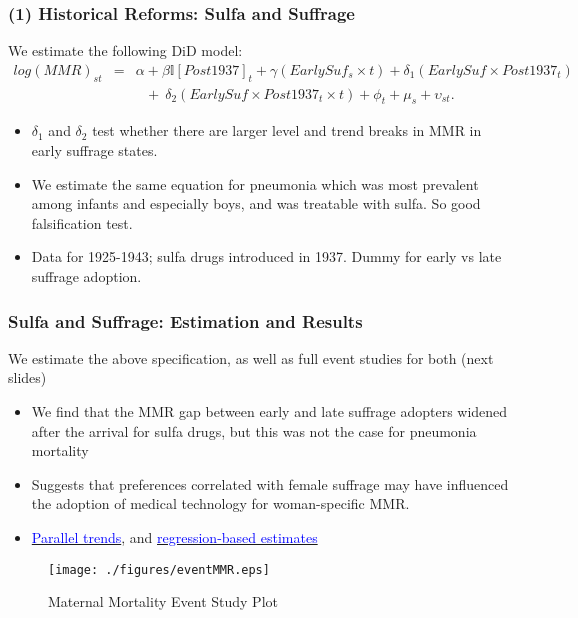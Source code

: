 \documentclass[10pt,letterpaper,subeqn]{beamer}
\begin{document}
\begin{frame}
\frametitle{(1) Historical Reforms: Sulfa and Suffrage}

We estimate the following DiD model:
\scriptsize
\begin{eqnarray}
log(MMR)_{st} & = &\alpha + \beta \mathbb{I}[Post1937]_t + \gamma(EarlySuf_{s}\times t)
                + \delta_1 (EarlySuf\times Post1937_t) \nonumber \\
              & &\ \ \ + \ \delta_2 (EarlySuf\times Post1937_t\times t) + \phi_t + \mu_s
                + \upsilon_{st}. \nonumber
\end{eqnarray}
\normalsize
\begin{itemize}
  \item $\delta_1$ and $\delta_2$ test whether there are larger level and trend 
        breaks in MMR in early suffrage states.
  \item We estimate the same equation for pneumonia which was most prevalent 
        among infants and especially boys, and was treatable with sulfa. So good 
        falsification test.
  \item Data for 1925-1943; sulfa drugs introduced in 1937. Dummy for early vs 
        late suffrage adoption.
\end{itemize}
\end{frame}

\begin{frame}[label=USA]
\frametitle{Sulfa and Suffrage: Estimation and Results}
We estimate the above specification, as well as full event studies for both 
(next slides)
\vspace{5mm}
\begin{itemize}
  \item We find that the MMR gap between early and late suffrage adopters widened 
        after the arrival for sulfa drugs, but this was not the case for 
        pneumonia mortality
  \item Suggests that preferences correlated with female suffrage may have 
        influenced the adoption of medical technology for woman-specific MMR.
  \item \hyperlink{ptrends}{\textcolor{blue}{Parallel trends}}, and 
        \hyperlink{DDreg}{\textcolor{blue}{regression-based estimates}}
\end{itemize}

\end{frame}

\begin{frame}
\begin{figure}
\caption{Maternal Mortality Event Study Plot}
\texttt{[image: ./figures/eventMMR.eps]}
\end{figure}
\end{frame}
\end{document}
